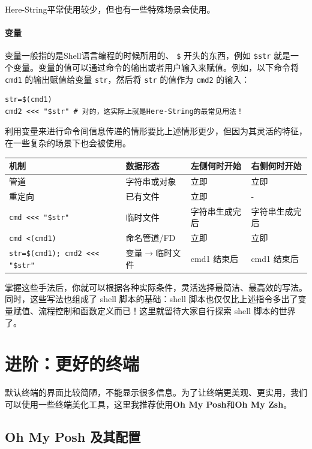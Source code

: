 Here-String平常使用较少，但也有一些特殊场景会使用。

\paragraph{变量} 变量一般指的是Shell语言编程的时候所用的、 \texttt{\$} 开头的东西，例如 \texttt{\$str} 就是一个变量。变量的值可以通过命令的输出或者用户输入来赋值。例如，以下命令将 \texttt{cmd1} 的输出赋值给变量 \texttt{str}，然后将 \texttt{str} 的值作为 \texttt{cmd2} 的输入：
\begin{verbatim}
str=$(cmd1)
cmd2 <<< "$str" # 对的，这实际上就是Here-String的最常见用法！
\end{verbatim}
利用变量来进行命令间信息传递的情形要比上述情形更少，但因为其灵活的特征，在一些复杂的场景下也会被使用。

\begin{table}[ht]\small
    \centering
    \begin{tabular}{llll}
        \toprule
        机制 & 数据形态 & 左侧何时开始 & 右侧何时开始 \\
        \midrule
        管道 & 字符串或对象 & 立即 & 立即 \\
        重定向 & 已有文件 & 立即 & - \\
        \texttt{cmd <<< "\$str"}  & 临时文件 & 字符串生成完后 & 字符串生成完后 \\
        \texttt{cmd <(cmd1)}  & 命名管道/FD & 立即 & 立即 \\
        \texttt{str=\$(cmd1); cmd2 <<< "\$str"}  & 变量$\rightarrow$临时文件 & cmd1 结束后 & cmd1 结束后 \\
        \bottomrule
    \end{tabular}
\end{table}

掌握这些手法后，你就可以根据各种实际条件，灵活选择最简洁、最高效的写法。同时，这些写法也组成了 shell 脚本的基础：shell 脚本也仅仅比上述指令多出了变量赋值、流程控制和函数定义而已！这里就留待大家自行探索 shell 脚本的世界了。

\section{进阶：更好的终端}

默认终端的界面比较简陋，不能显示很多信息。为了让终端更美观、更实用，我们可以使用一些终端美化工具，这里我推荐使用\textbf{Oh My Posh}和\textbf{Oh My Zsh}。

\subsection{Oh My Posh 及其配置}

